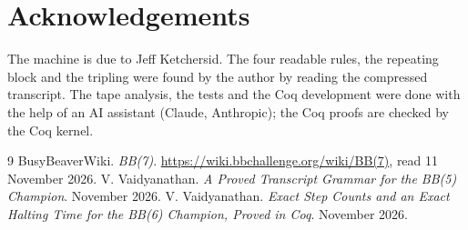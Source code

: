 \documentclass[11pt]{article}
\theoremstyle{remark}
\begin{document}
\section*{Acknowledgements}

The machine is due to Jeff Ketchersid. The four readable rules, the repeating
block and the tripling were found by the author by reading the compressed
transcript. The tape analysis, the tests and the Coq development were done with
the help of an AI assistant (Claude, Anthropic); the Coq proofs are checked by
the Coq kernel.

\begin{thebibliography}{9}
BusyBeaverWiki. \emph{BB(7)}. \url{https://wiki.bbchallenge.org/wiki/BB(7)},
read 11 November 2026.
V. Vaidyanathan. \emph{A Proved Transcript Grammar for the BB(5) Champion}.
November 2026.
V. Vaidyanathan. \emph{Exact Step Counts and an Exact Halting Time for the
BB(6) Champion, Proved in Coq}. November 2026.
\end{thebibliography}
\end{document}
